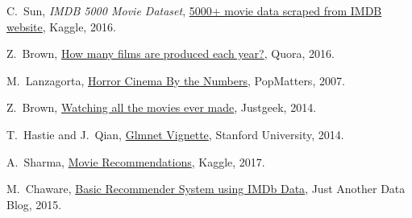 \documentclass{article}
\begin{document}
\begin{thebibliography}{1}


C.~Sun, \emph{IMDB 5000 Movie Dataset}, \href{https://www.kaggle.com/deepmatrix/imdb-5000-movie-dataset}{5000+ movie data scraped from IMDB website}, \relax Kaggle, 2016.

Z.~Brown, \href{https://www.quora.com/How-many-films-are-produced-each-year}{How many films are produced each year?}, \relax Quora, 2016.

M.~Lanzagorta, \href{http://www.popmatters.com/column/horror-cinema-by-the-numbers/}{Horror Cinema By the Numbers}, \relax PopMatters, 2007.

Z.~Brown, \href{http://www.justgeek.de/watching-all-the-movies-ever-made/}{Watching all the movies ever made}, \relax Justgeek, 2014.

T.~Hastie and J.~Qian, \href{https://web.stanford.edu/~hastie/glmnet/glmnet_alpha.html}{Glmnet Vignette}, \relax Stanford University, 2014.

A.~Sharma, \href{https://www.kaggle.com/arjoonn/movie-recommendations}{Movie Recommendations}, \relax Kaggle, 2017.

M.~Chaware, \href{http://justanotherdataenthusiast.blogspot.co.uk/2015/12/basic-recommender-system-using-imdb-data.html}{Basic Recommender System using IMDb Data}, \relax Just Another Data Blog, 2015.

\end{thebibliography}

%

\end{document}
